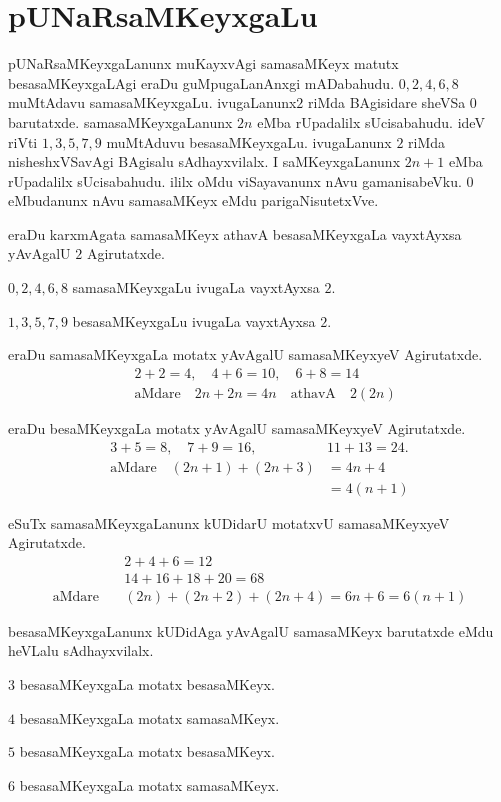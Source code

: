 \chapter{pUNaRsaMKeyxgaLu}

pUNaRsaMKeyxgaLanunx muKayxvAgi samasaMKeyx matutx besasaMKeyxgaLAgi eraDu guMpu\-gaLanAnxgi mADabahudu. $0,2,4,6,8$ muMtAdavu samasaMKeyxgaLu. ivugaLanunx\-$2$ riMda BAgisidare sheVSa $0$ barutatxde. samasaMKeyxgaLanunx $2n$ eMba rUpadalilx sUci\-sabahudu. ideV riVti $1,3,5,7,9$ muMtAduvu besasaMKeyxgaLu. ivugaLanunx $2$ riMda nisheshxVSavAgi BAgisalu sAdhayxvilalx. I saMKeyxgaLanunx $2n+1$ eMba rUpadalilx sUcisabahudu. ililx oMdu viSayavanunx nAvu gamanisabeVku. $0$ eMbudanunx nAvu samasaMKeyx eMdu parigaNisutetxVve.

eraDu karxmAgata samasaMKeyx athavA besasaMKeyxgaLa vayxtAyxsa yAvAgalU $2$ \-Agirutatxde.

$0,2,4,6,8$ samasaMKeyxgaLu ivugaLa vayxtAyxsa $2$. 

$1,3,5,7,9$ besasaMKeyxgaLu ivugaLa vayxtAyxsa $2$. 

eraDu samasaMKeyxgaLa motatx yAvAgalU samasaMKeyxyeV Agirutatxde.
\begin{align*}
&2+2 =4, \quad 4+6=10, \quad 6+8=14\\
&\text{aMdare}\quad 2n+2n =4n\quad \text{athavA}\quad 2(2n)
\end{align*}

eraDu besaMKeyxgaLa motatx yAvAgalU samasaMKeyxyeV Agirutatxde.
\begin{align*}
3+5=8,\quad 7+9=16,\quad &11+13 =24.\\
\text{aMdare}\quad (2n+1)+(2n+3)&= 4n+4\\
 &= 4(n+1)
\end{align*}

eSuTx samasaMKeyxgaLanunx kUDidarU motatxvU samasaMKeyxyeV Agirutatxde.
\begin{align*}
&2+4+6=12\\
&14+16+18+20=68\\
\text{aMdare}\quad &(2n)+(2n+2)+(2n+4)=6n+6=6(n+1)
\end{align*}

besasaMKeyxgaLanunx kUDidAga yAvAgalU samasaMKeyx barutatxde eMdu heVLalu sAdhayxvilalx.
\begin{description}
\item $3$ besasaMKeyxgaLa motatx besasaMKeyx.
\item $4$ besasaMKeyxgaLa motatx samasaMKeyx.
\item $5$ besasaMKeyxgaLa motatx besasaMKeyx.
\item $6$ besasaMKeyxgaLa motatx samasaMKeyx.
\end{description}

